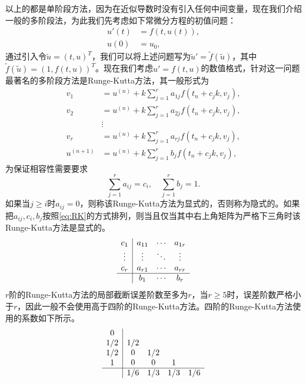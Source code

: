 \documentclass[a4paper,10pt]{ctexart}
\begin{document}
以上的都是单阶段方法，因为在近似导数时没有引入任何中间变量，现在我们介绍一般的多阶段法，为此我们先考虑如下常微分方程的初值问题：
\[
    \begin{aligned}
        u'(t) &= f(t,u(t)),\\
        u(0) &= u_0,
    \end{aligned}
\]
通过引入令$ \tilde{u}=(t,u)^T $，我们可以将上述问题写为$ \tilde{u}' = \tilde{f}(\tilde{u}) $，其中$ \tilde{f}(\tilde{u}) = (1,f(t,u))^T $。现在我们考虑$ u' = f(t,u) $的数值格式，针对这一问题最著名的多阶段方法是Runge-Kutta方法，其一般形式为
\begin{equation}
    \begin{aligned}
        v_1 &= u^{(n)} + k \sum_{j=1}^r a_{1j}f(t_n+c_j k, v_j),\\
        v_2 &= u^{(n)} + k \sum_{j=1}^r a_{2j}f(t_n+c_j k, v_j),\\
        &\vdots\\
        v_r &= u^{(n)} + k \sum_{j=1}^r a_{rj}f(t_n+c_j k, v_j),\\
        u^{(n+1)} &= u^{(n)} + k \sum_{j=1}^r b_j f(t_n+c_j k, v_j),
    \end{aligned}
\end{equation}
为保证相容性需要要求
\[
    \sum_{j=1}^r a_{ij} = c_i,\quad \sum_{j=1}^r b_j = 1.
\]
如果当$ j\geqslant i $时$ a_{ij} = 0 $，则称该Runge-Kutta方法为显式的，否则称为隐式的。如果把$ a_{ij},c_i,b_j $按照\eqref{eq:RK}的方式排列，则当且仅当其中右上角矩阵为严格下三角时该Runge-Kutta方法是显式的。
\begin{equation}\label{eq:RK}
    \begin{array}{c|ccc}
        c_1 & a_{11} & \cdots & a_{1r} \\
        \vdots & \vdots & \ddots & \vdots \\
        c_r & a_{r1} & \cdots & a_{rr} \\\hline
            & b_1 & \cdots & b_r
    \end{array}
\end{equation}
$ r $阶的Runge-Kutta方法的局部截断误差阶数至多为$ r $，当$ r\geqslant 5 $时，误差阶数严格小于$ r $，因此一般不会使用高于四阶的Runge-Kutta方法。四阶的Runge-Kutta方法使用的系数如下所示。
\begin{equation}
    \begin{array}{c|cccc}
        0 &  &  &  & \\
        1/2 & 1/2 &  &  & \\
        1/2 & 0 & 1/2 &  & \\
        1 & 0 & 0 & 1 & \\\hline
            & 1/6 & 1/3 & 1/3 & 1/6
    \end{array}
\end{equation}
\end{document}
